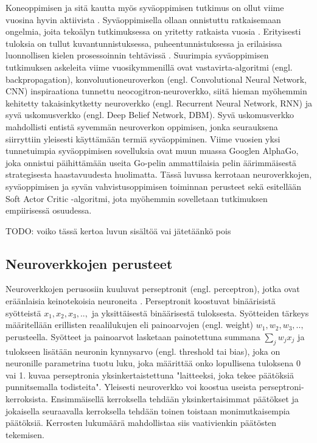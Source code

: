 \documentclass[utf8]{gradu3}
\begin{document}
Koneoppimisen ja sitä kautta myös syväoppimisen tutkimus on ollut viime vuosina hyvin aktiivista \parencite{pouyanfar2018survey}. Syväoppimisella ollaan onnistuttu ratkaisemaan ongelmia, joita tekoälyn tutkimuksessa on yritetty ratkaista vuosia \parencite{lecun2015deep,pouyanfar2018survey}. Erityisesti tuloksia on tullut kuvantunnistuksessa, puheentunnistuksessa ja erilaisissa luonnollisen kielen prosessoinnin tehtävissä \parencite{lecun2015deep,pouyanfar2018survey}. Suurimpia syväoppimisen tutkimuksen askeleita viime vuosikymmenillä ovat vastavirta-algoritmi (engl. backpropagation), konvoluutioneuroverkon (engl. Convolutional Neural Network, CNN) inspiraationa tunnettu neocogitron-neuroverkko, siitä hieman myöhemmin kehitetty takaisinkytketty neuroverkko (engl. Recurrent Neural Network, RNN) ja syvä uskomusverkko (engl. Deep Belief Network, DBM). Syvä uskomusverkko mahdollisti entistä syvemmän neuroverkon oppimisen, jonka seurauksena siirryttiin yleisesti käyttämään termiä syväoppiminen. Viime vuosien yksi tunnetuimpia syväoppimisen sovelluksia ovat muun muassa Googlen AlphaGo, joka onnistui päihittämään useita Go-pelin ammattilaisia pelin äärimmäisestä strategisesta haastavuudesta huolimatta. Tässä luvussa kerrotaan neuroverkkojen, syväoppimisen ja syvän vahvistusoppimisen toiminnan perusteet sekä esitellään Soft Actor Critic -algoritmi, jota myöhemmin sovelletaan tutkimuksen empiirisessä osuudessa.

TODO: voiko tässä kertoa luvun sisältöä vai jätetäänkö pois

\subsection{Neuroverkkojen perusteet}

Neuroverkkojen perusosiin kuuluvat perseptronit (engl. perceptron), jotka ovat eräänlaisia keinotekoisia neuroneita \parencite{nielsen2015neural}. Perseptronit koostuvat binäärisistä syötteistä \(x_{1}, x_{2}, x_{3},..,\) ja yksittäisestä binäärisestä tuloksesta. Syötteiden tärkeys määritellään erillisten reaalilukujen eli painoarvojen (engl. weight) \(w_{1}, w_{2}, w_{3},..,\) perusteella. Syötteet ja painoarvot lasketaan painotettuna summana $\sum_{j}w_{j}x_{j}$ ja tulokseen lisätään neuronin kynnysarvo (engl. threshold tai bias), joka on neuronille parametrina tuotu luku, joka määrittää onko lopullisena tuloksena 0 vai 1. \cite{nielsen2015neural} kuvaa perseptronia yksinkertaistettuna "laitteeksi, joka tekee päätöksiä punnitsemalla todisteita". Yleisesti neuroverkko voi koostua useista perseptroni-kerroksista. Ensimmäisellä kerroksella tehdään yksinkertaisimmat päätökset ja jokaisella seuraavalla kerroksella tehdään toinen toistaan monimutkaisempia päätöksiä. Kerrosten lukumäärä mahdollistaa siis vaativienkin päätösten tekemisen.
\end{document}
